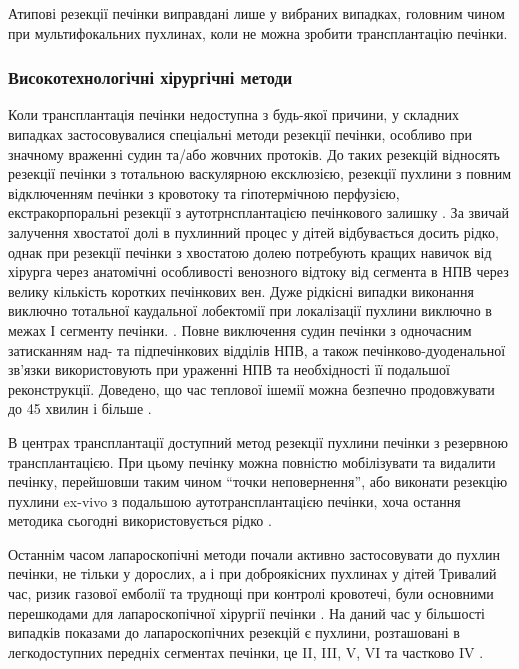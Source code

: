Атипові резекції печінки виправдані лише у вибраних випадках, головним чином при мультифокальних пухлинах, коли не можна зробити трансплантацію печінки. 

\subsubsection{Високотехнологічні хірургічні методи}

Коли трансплантація печінки недоступна з будь-якої причини, у складних випадках застосовувалися спеціальні методи резекції печінки, особливо при значному враженні судин та/або жовчних протоків. До таких резекцій відносять резекції печінки з тотальною васкулярною ексклюзією, резекції пухлини з повним відключенням печінки з кровотоку та гіпотермічною перфузією, екстракорпоральні резекції з аутотрнсплантацією печінкового залишку \cite{pmid33718305}. За звичай залучення хвостатої долі в пухлинний процес у дітей відбувається досить рідко, однак при резекції печінки з хвостатою долею потребують кращих навичок від хірурга через анатомічні особливості венозного відтоку від сегмента в НПВ через велику кількість коротких печінкових вен. Дуже рідкісні випадки виконання виключно тотальної каудальної лобектомії при локалізації пухлини виключно в межах І сегменту печінки. \cite{pmid34441025}. Повне виключення судин печінки з одночасним затисканням над- та підпечінкових відділів НПВ, а також печінково-дуоденальної зв’язки використовують при ураженні НПВ та необхідності її  подальшої реконструкції. Доведено, що час теплової ішемії можна безпечно продовжувати до 45 хвилин і більше \cite{pmid7754739}. 

В центрах трансплантації доступний метод резекції пухлини печінки з резервною трансплантацією. При цьому печінку можна повністю мобілізувати та видалити печінку, перейшовши таким чином “точки неповернення”, або виконати резекцію пухлини ex-vivo з подальшою аутотрансплантацією печінки, хоча остання методика сьогодні використовується рідко \cite{pmid34464895}.

Останнім часом лапароскопічні методи почали активно застосовувати до пухлин печінки, не тільки у дорослих, а і при доброякісних пухлинах у дітей \cite{pmid7796018} Тривалий час, ризик газової емболії та труднощі при контролі кровотечі, були основними перешкодами для лапароскопічної хірургії печінки \cite{pmid8640025}. На даний час у більшості випадків показами до лапароскопічних резекцій є пухлини, розташовані в легкодоступних передніх сегментах печінки, це II, III, V, VI та частково IV \cite{pmid8749932}. 

